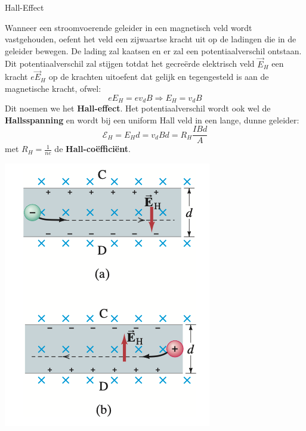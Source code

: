 \begin{theo}{Hall-Effect}
    \begin{minipage}{0.78\textwidth}
        Wanneer een stroomvoerende geleider in een magnetisch veld wordt vastgehouden,
        oefent het veld een zijwaartse kracht uit op de ladingen die in de geleider bewegen.
        De lading zal kaatsen en er zal een potentiaalverschil ontstaan. Dit potentiaalverschil zal
        stijgen totdat het gecreërde elektrisch veld $\Vec{E}_H$ een kracht $e\Vec{E}_H$
        op de krachten uitoefent dat gelijk en tegengesteld is aan de magnetische kracht, ofwel:
        \begin{equation*}
            eE_H = ev_{d}B \Rightarrow E_H = v_{d}B
        \end{equation*}
        Dit noemen we het \textbf{Hall-effect}. Het potentiaalverschil wordt ook wel de \textbf{Hallsspanning}
        en wordt bij een uniform Hall veld in een lange, dunne geleider:
        \begin{equation*}
            \mathcal{E}_H = E_{H}d = v_{d}Bd = R_H\dfrac{IBd}{A}
        \end{equation*}
        met $R_H = \tfrac{1}{ne}$ de \textbf{Hall-coëfficiënt}.
    \end{minipage}
    \begin{minipage}{.18\textwidth}
        \includegraphics[scale = 0.3]{Images/Magnetisme/HallEffect}
    \end{minipage}
    \vspace{0.2cm}

\end{theo}

